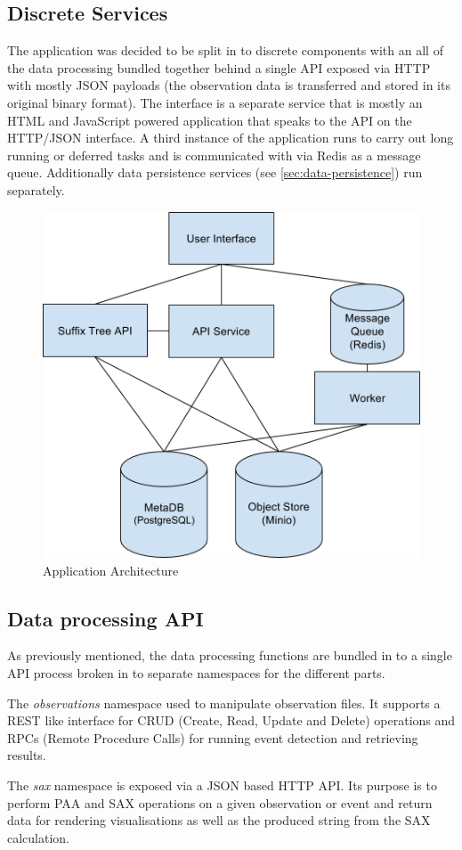 \documentclass[../report.tex]{subfiles}
\begin{document}
\subsection{Discrete Services}

	The application was decided to be split in to discrete components with an all of the data processing  bundled together behind a single API exposed via HTTP with mostly JSON payloads (the observation data is transferred and stored in its original binary format).  The interface is a separate service that is mostly an HTML and JavaScript powered application that speaks to the API on the HTTP/JSON interface.  A third instance of the application runs to carry out long running or deferred tasks and is communicated with via Redis as a message queue.  Additionally data persistence services (see \cref{sec:data-persistence}) run separately.
	
\begin{figure}[h]
	\centering
	\includegraphics[width=.5\linewidth]{img/architecture}
	\caption{Application Architecture}
	\label{fig:architecture}
\end{figure}

\subsection{Data processing API}

	As previously mentioned, the data processing functions are bundled in to a single API process broken in to separate namespaces for the different parts.

	The \textit{observations} namespace used to manipulate observation files.  It supports a REST like interface for CRUD (Create, Read, Update and Delete) operations and RPCs (Remote Procedure Calls) for running event detection and retrieving results.
	
	The \textit{sax} namespace is exposed via a JSON based HTTP API.  Its purpose is to perform PAA and SAX operations on a given observation or event and return data for rendering visualisations as well as the produced string from the SAX calculation.
	
\end{document}
